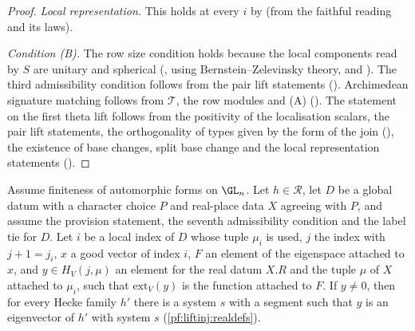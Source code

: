 \begin{proof}
\emph{Local representation.} This holds at every $i$ by  (from the faithful reading and its laws).

\emph{Condition (B).} The row size condition holds because the local components read by $S$ are unitary and spherical
(, using Bernstein--Zelevinsky theory, and
). The third admissibility condition follows from the pair lift statements
(). Archimedean signature matching follows from $\mathcal T$, the row modules and
(A) (). The statement on the first theta lift follows from the positivity of the
localisation scalars, the pair lift statements, the orthogonality of types given by the form of the join
(), the existence of base changes, split base change and the local representation statements
().
\end{proof}

\begin{proposition}\label{pf:liftinj:eigstr}
Assume finiteness of automorphic forms on $\GL_n$. Let $h\in\mathcal R$, let $D$ be a global datum with a character choice $P$ and real-place data $X$
agreeing with $P$, and assume the provision statement, the seventh admissibility condition and the label tie for $D$. Let $i$ be a local index of $D$
whose tuple $\mu_i$ is used, $j$ the index with $j+1=j_i$, $x$ a good vector of index $i$, $F$ an element of the eigenspace attached to $x$, and
$y\in H_V(j,\mu)$ an element for the real datum $X.R$ and the tuple $\mu$ of $X$ attached to $\mu_i$, such that $\mathrm{ext}_V(y)$ is the function attached
to $F$. If $y\ne0$, then for every Hecke family $h'$ there is a system $s$ with a segment such that $y$ is an eigenvector of $h'$ with system $s$
(\cref{pf:liftinj:realdefs}).
\end{proposition}

